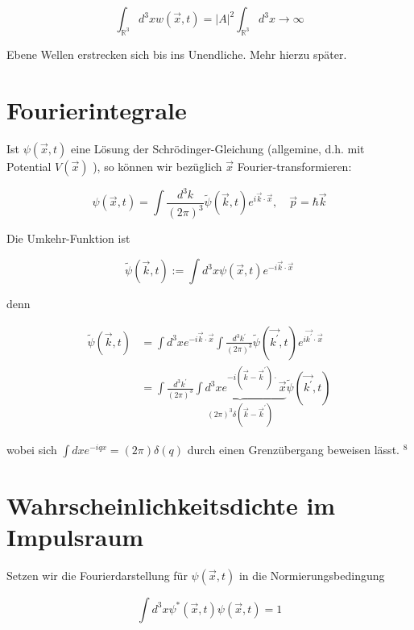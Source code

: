 \documentclass[10pt, letterpaper]{article}
\begin{document}
$$
\int_{\mathbb{R}^{3}} d^{3} x w(\vec{x}, t)=|A|^{2} \int_{\mathbb{R}^{3}} d^{3} x \rightarrow \infty
$$

Ebene Wellen erstrecken sich bis ins Unendliche. Mehr hierzu später.

\section*{Fourierintegrale}
Ist $\psi(\vec{x}, t)$ eine Lösung der Schrödinger-Gleichung (allgemine, d.h. mit Potential $V(\vec{x})$ ), so können wir bezüglich $\vec{x}$ Fourier-transformieren:

$$
\psi(\vec{x}, t)=\int \frac{d^{3} k}{(2 \pi)^{3}} \tilde{\psi}(\vec{k}, t) e^{i \vec{k} \cdot \vec{x}}, \quad \vec{p}=\hbar \vec{k}
$$

Die Umkehr-Funktion ist

$$
\tilde{\psi}(\vec{k}, t):=\int d^{3} x \psi(\vec{x}, t) e^{-i \vec{k} \cdot \vec{x}}
$$

denn

$$
\begin{aligned}
\tilde{\psi}(\vec{k}, t) & =\int d^{3} x e^{-i \vec{k} \cdot \vec{x}} \int \frac{d^{3} k^{\prime}}{(2 \pi)^{3}} \tilde{\psi}\left(\overrightarrow{k^{\prime}}, t\right) e^{i \overrightarrow{k^{\prime}} \cdot \vec{x}} \\
& =\int \frac{d^{3} k^{\prime}}{(2 \pi)^{3}} \underbrace{\int d^{3} x e^{-i\left(\vec{k}-\vec{k}^{\prime}\right) \cdot} \vec{x}}_{(2 \pi)^{3} \delta\left(\vec{k}-\vec{k}^{\prime}\right)} \tilde{\psi}\left(\overrightarrow{k^{\prime}}, t\right)
\end{aligned}
$$

wobei sich $\int d x e^{-i q x}=(2 \pi) \delta(q)$ durch einen Grenzübergang beweisen lässt. ${ }^{8}$

\section*{Wahrscheinlichkeitsdichte im Impulsraum}
Setzen wir die Fourierdarstellung für $\psi(\vec{x}, t)$ in die Normierungsbedingung

$$
\int d^{3} x \psi^{*}(\vec{x}, t) \psi(\vec{x}, t)=1
$$
\end{document}
